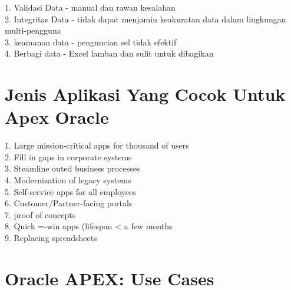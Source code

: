 \documentclass[12pt, times new roman, a4paper]{article}
\begin{document}
1. Validasi Data - manual dan rawan kesalahan\\
2. Integritas Data - tidak dapat menjamin keakuratan data dalam 	 lingkungan multi-pengguna\\
3. keamanan data - penguncian sel tidak efektif\\
4. Berbagi data - Excel lamban dan sulit untuk dibagikan\\

\section{Jenis Aplikasi Yang Cocok Untuk Apex Oracle}

1. Large mission-critical apps for thousand of users\\
2. Fill in gaps in corporate systems\\
3. Steamline outed business processes\\
4. Modernization of legacy systems\\
5. Self-service apps for all employees\\
6. Customer/Partner-facing portals\\
7. proof of concepts\\
8. Quick =-win apps (lifespan < a few months\\
9. Replacing spreadsheets\\

\section{Oracle APEX: Use Cases}
\end{document}
